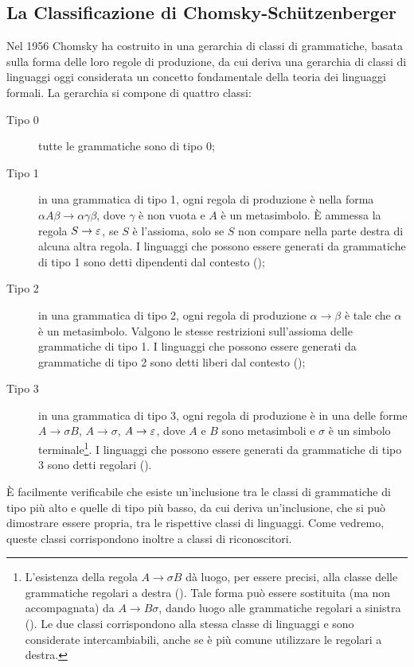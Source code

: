 \subsection{La Classificazione di Chomsky-Schützenberger}\label{subs:prel:chomshutz}
Nel 1956 Chomsky ha costruito in \cite{Chomsky:56:hier} una gerarchia di classi di grammatiche, basata sulla forma delle loro regole di produzione, da cui deriva una gerarchia di classi di linguaggi oggi considerata un concetto fondamentale della teoria dei linguaggi formali. La gerarchia si compone di quattro classi:
\begin{description}
	\item[Tipo 0] tutte le grammatiche sono di tipo 0;
	\item[Tipo 1] in una grammatica di tipo 1, ogni regola di produzione è nella forma $\alpha A\beta\to\alpha\gamma\beta$, dove $\gamma$ è non vuota e $A$ è un metasimbolo. È ammessa la regola $S\to\varepsilon$, se $S$ è l'assioma, solo se $S$ non compare nella parte destra di alcuna altra regola. I linguaggi che possono essere generati da grammatiche di tipo 1 sono detti dipendenti dal contesto ();
	\item[Tipo 2] in una grammatica di tipo 2, ogni regola di produzione $\alpha\to\beta$ è tale che $\alpha$ è un metasimbolo. Valgono le stesse restrizioni sull'assioma delle grammatiche di tipo 1. I linguaggi che possono essere generati da grammatiche di tipo 2 sono detti liberi dal contesto ();
	\item[Tipo 3] in una grammatica di tipo 3, ogni regola di produzione è in una delle forme $A\to\sigma B$, $A\to\sigma$, $A\to\varepsilon$, dove $A$ e $B$ sono metasimboli e $\sigma$ è un simbolo terminale\footnote{L'esistenza della regola $A\to\sigma B$ dà luogo, per essere precisi, alla classe delle grammatiche regolari a destra (). Tale forma può essere sostituita (ma non accompagnata) da $A\to B\sigma$, dando luogo alle grammatiche regolari a sinistra (). Le due classi corrispondono alla stessa classe di linguaggi e sono considerate intercambiabili, anche se è più comune utilizzare le regolari a destra.}. I linguaggi che possono essere generati da grammatiche di tipo 3 sono detti regolari ().
\end{description}
È facilmente verificabile che esiste un'inclusione tra le classi di grammatiche di tipo più alto e quelle di tipo più basso, da cui deriva un'inclusione, che si può dimostrare essere propria, tra le rispettive classi di linguaggi. Come vedremo, queste classi corrispondono inoltre a classi di riconoscitori.



